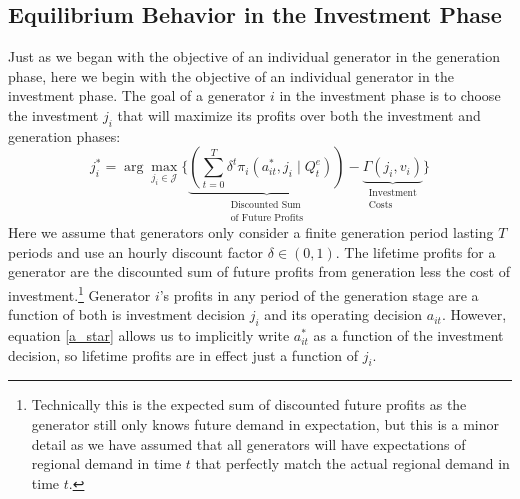 \subsection{Equilibrium Behavior in the Investment Phase}

Just as we began with the objective of an individual generator in the generation phase, here we begin with the objective of an individual generator in the investment phase. The goal of a generator $i$ in the investment phase is to choose the investment $j_i$ that will maximize its profits over both the investment and generation phases:
\begin{equation}
    j_i^* = \arg\max_{j_i \in \mathcal{J}} \biggl\{ \underbrace{\left(\sum_{t = 0}^T \delta^t \pi_i (a_{it}^*, j_i\mid Q_t^e) \right)}_{\substack{\text{Discounted Sum}\\ \text{of Future Profits}}} - \underbrace{\Gamma(j_i, v_i)}_{\substack{\text{Investment}\\ \text{Costs}}} \biggr\}
\end{equation}
Here we assume that generators only consider a finite generation period lasting $T$ periods and use an hourly discount factor $\delta \in (0, 1)$. The lifetime profits for a generator are the discounted sum of future profits from generation less the cost of investment.\footnote{Technically this is the expected sum of discounted future profits as the generator still only knows future demand in expectation, but this is a minor detail as we have assumed that all generators will have expectations of regional demand in time $t$ that perfectly match the actual regional demand in time $t$.} Generator $i$'s profits in any period of the generation stage are a function of both is investment decision $j_i$ and its operating decision $a_{it}$. However, equation \eqref{a_star} allows us to implicitly write $a_{it}^*$ as a function of the investment decision, so lifetime profits are in effect just a function of $j_i$. 

